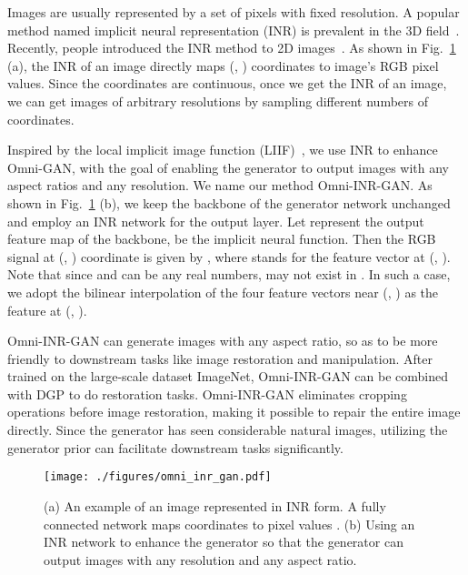 \documentclass[paper_2425.tex]{subfiles}
\begin{document}
Images are usually represented by a set of pixels with fixed resolution. A popular method named implicit neural representation (INR) is prevalent in the 3D field~\cite{park2019DeepSDF,mescheder2019Occupancy,chen2019Learninga}. Recently, people introduced the INR method to 2D images~\cite{chen2020Learning,skorokhodov2020Adversarial}. As shown in Fig.~\ref{apx:fig:omni_inr_gan} (a), the INR of an image directly maps (, ) coordinates to image's RGB pixel values. Since the coordinates are continuous, once we get the INR of an image, we can get images of arbitrary resolutions by sampling different numbers of coordinates.

Inspired by the local implicit image function (LIIF)~\cite{chen2020Learning}, we use INR to enhance Omni-GAN, with the goal of enabling the generator to output images with any aspect ratios and any resolution. We name our method Omni-INR-GAN.
As shown in Fig.~\ref{apx:fig:omni_inr_gan} (b), we keep the backbone of the generator network unchanged and employ an INR network for the output layer. Let  represent the output feature map of the backbone,  be the implicit neural function. Then the RGB signal at (, ) coordinate is given by , where  stands for the feature vector at (, ). Note that since  and  can be any real numbers,  may not exist in . In such a case, we adopt the bilinear interpolation of the four feature vectors near (, ) as the feature at (, ).

Omni-INR-GAN can generate images with any aspect ratio, so as to be more friendly to downstream tasks like image restoration and manipulation. After trained on the large-scale dataset ImageNet, Omni-INR-GAN can be combined with DGP to do restoration tasks. Omni-INR-GAN eliminates cropping operations before image restoration, making it possible to repair the entire image directly. Since the generator has seen considerable natural images, utilizing the generator prior can facilitate downstream tasks significantly.


\begin{figure}[t]
  \begin{center}
\texttt{[image: ./figures/omni\_inr\_gan.pdf]}
  \end{center}
  \vspace{-0.5cm}
  \caption{(a) An example of an image represented in INR form. A fully connected network maps coordinates  to pixel values . (b) Using an INR network to enhance the generator so that the generator can output images with any resolution and any aspect ratio.}
  \label{apx:fig:omni_inr_gan}
\end{figure}
\end{document}
